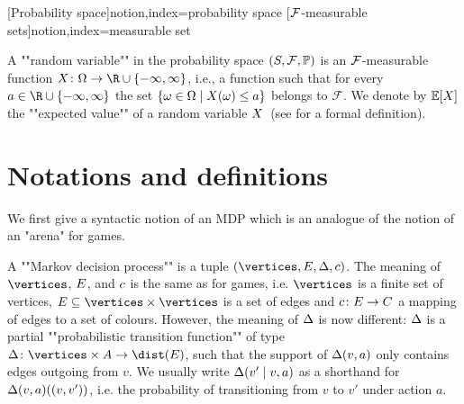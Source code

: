 [Probability space]{notion,index={probability space}}
[$\mathcal{F}$-measurable 
sets]{notion,index={measurable set}}

A ""random variable"" in the probability space $(S,\mathcal{F},\mathbb{P})$ is an $\mathcal{F}$-measurable function $\rvar\colon \Omega \rightarrow \R \cup
\{-\infty,\infty\}$, i.e.,
a function such that for every $a\in \R \cup \{ -\infty,\infty\}$ the set
$\{\omega\in \Omega\mid X(\omega)\leq a\}$ belongs to $\mathcal{F}$. We denote by $\mathbb{E}[X]$ the ""expected value"" of a random variable $X$~(see \cite[Chapter 5]{Bil:1995}
for a formal definition).


\section*{Notations and definitions}

We first give a syntactic notion of an MDP which is an analogue of the notion of an "arena" for games.

\begin{definition}[""MDP""]
\label{5-def:MDP}
A ""Markov decision process"" is a tuple $(\vertices,\edges,\probTranFunc,\colouring)$. The meaning of $\vertices$, $E$, and $c$ is the same as for games, i.e. $\vertices$ is a finite set of vertices, $\edges\subseteq \vertices\times\vertices$ is a set of edges and $c\colon E \rightarrow C$ a mapping of edges to a set of colours. However, the meaning of $\Delta$ is now different: $\Delta$ is a partial ""probabilistic transition function"" of type $\probTranFunc\colon \vertices \times \actions \rightarrow \dist(\edges)$, such that the support of $\Delta(v,a)$ only contains edges outgoing from $v$.
 We usually write $\Delta(v'\mid v,a)$ as a shorthand for $\Delta(v,a)((v,v'))$, i.e. the probability of transitioning from $v$ to $v'$ under action $a$.
\end{definition}

